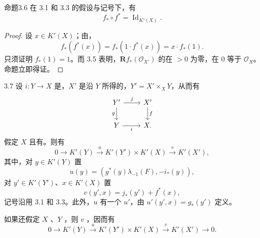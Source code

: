 \begin{SGAresult}{命题}{3.6}
在 3.1 和 3.3 的假设与记号下，有
\[
f_*\circ f^*=\operatorname{Id}_{K'(X)}.
\]
\end{SGAresult}
\begin{proof}
设 $x\in K'(X)$；由，
\[
f_*(f^*(x))=f_*(1\cdot f^*(x))=x\cdot f_*(1).
\]
只须证明 $f_*(1)=1$。而 3.5 表明，$\mathbf Rf_*(\mathcal O_{X'})$ 的在 $>0$ 为零，在 $0$ 等于 $\mathcal O_X$。命题立即得证。
\end{proof}

\begin{SGAresult}{}{3.7}
设 $i:Y\to X$ 是，$X'$ 是沿 $Y$ 所得的，$Y'=X'\times_XY$，从而有
\[
\begin{tikzcd}
Y'\arrow[r,"j"]\arrow[d,"g"']&X'\arrow[d,"f"]\\
Y\arrow[r,"i"']&X.
\end{tikzcd}
\]
假定 $X$ 且有。则有
\[
0\longrightarrow K'(Y)\xrightarrow{u}K'(Y')\times K'(X)\xrightarrow{v}K'(X'),
\]
其中，对 $y\in K'(Y)$ 置
\[
u(y)=(g^*(y)\lambda_{-1}(F),-i_*(y)),
\]
对 $y'\in K'(Y')$、$x\in K'(X)$ 置
\[
v(y',x)=j_*(y')+f^*(x),
\]
记号沿用 3.1 和 3.3。此外，$u$ 有一个 $u'$，由 $u'(y',x)=g_*(y')$ 定义。

如果还假定 $X$ 、$Y$ ，则 $v$ ，因而有
\[
0\longrightarrow K'(Y)\xrightarrow{u}K'(Y')\times K'(X)\xrightarrow{v}K'(X')\longrightarrow0.
\]
\end{SGAresult}
